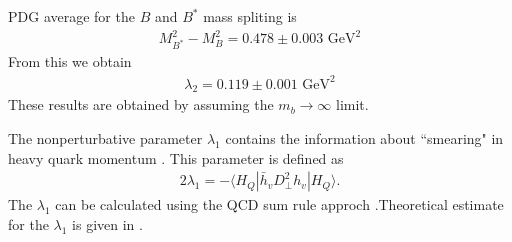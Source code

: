 PDG average for the $B$ and $B^*$ mass spliting is
\begin{eqnarray}
M_{B^{*}}^{2}-M_{B}^{2} = 0.478\pm 0.003 \text{ GeV}^{2}
\end{eqnarray}
From this we obtain 
\begin{eqnarray}  
\lambda_{2} = 0.119\pm 0.001 \text{ GeV}^{2}
\end{eqnarray}
These results are obtained by assuming the $m_b\rightarrow \infty$ limit.\par
The nonperturbative parameter $\lambda_1$ contains the information about ``smearing" in heavy quark momentum \cite{Ball:1993xv}. This parameter is defined as
\begin{eqnarray}
2\lambda_1=-\langle H_Q|\bar{h}_v D^2_{\perp}h_v|H_Q\rangle.
\end{eqnarray}
The $\lambda_1$ can be calculated using the QCD sum rule approch \cite{Ball:1993xv}.Theoretical estimate for the $\lambda_1$ is given in \cite{Gambino:2016jkc}. 
